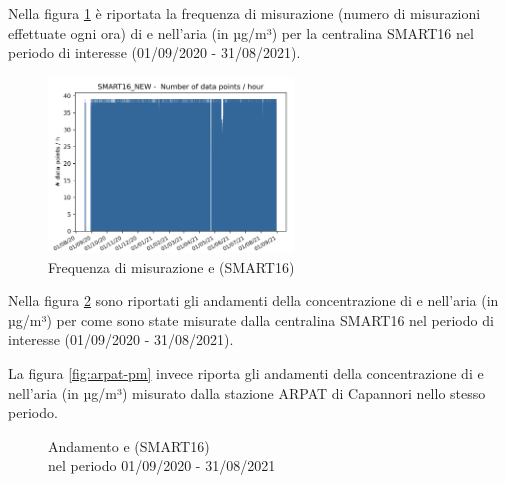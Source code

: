 Nella figura \ref{fig:arpat-pm-freq} è riportata la frequenza di misurazione (numero di misurazioni effettuate ogni ora) di  e  nell'aria (in µg/m³) per la centralina SMART16 nel periodo di interesse (01/09/2020 - 31/08/2021).

\begin{figure}[H]
\centering
\captionsetup{justification=centering}
\includegraphics[width=0.58\textwidth,height=\textheight,keepaspectratio]{img/smart16_new_count.png}
\caption{Frequenza di misurazione  e  (SMART16)}
\label{fig:arpat-pm-freq}
\end{figure}

Nella figura \ref{fig:smart16-pm} sono riportati gli andamenti della concentrazione di  e  nell'aria (in µg/m³) per come sono state misurate dalla centralina SMART16 nel periodo di interesse (01/09/2020 - 31/08/2021).

La figura \ref{fig:arpat-pm} invece riporta gli andamenti della concentrazione di  e  nell'aria (in µg/m³) misurato dalla stazione ARPAT di Capannori nello stesso periodo.

\begin{figure}[H]%
    \centering
    \captionsetup{justification=centering}
    \caption{Andamento  e  (SMART16)\\nel periodo 01/09/2020 - 31/08/2021}%
    \label{fig:smart16-pm}%
\end{figure}

